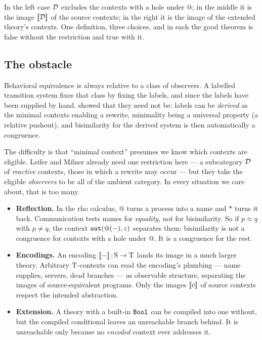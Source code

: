 \documentclass{article}
\begin{document}
\begin{center}
\end{center}

\noindent In the left case $\mathcal{D}$ excludes the contexts with a hole under $@$; in the middle it is the image $[\![\mathcal{D}]\!]$ of the source contexts; in the right it is the image of the extended theory's contexts. One definition, three choices, and in each the good theorem is false without the restriction and true with it.

\subsection{The obstacle}

Behavioral equivalence is always relative to a class of observers. A labelled transition system fixes that class by fixing the labels, and since \citet{ccs} the labels have been supplied by hand. \citet{lm} showed that they need not be: labels can be \emph{derived} as the minimal contexts enabling a rewrite, minimality being a universal property (a relative pushout), and bisimilarity for the derived system is then automatically a congruence.

The difficulty is that ``minimal context'' presumes we know which contexts are eligible. Leifer and Milner already need one restriction here --- a subcategory $\mathcal{D}$ of \emph{reactive} contexts, those in which a rewrite may occur --- but they take the eligible \emph{observers} to be all of the ambient category. In every situation we care about, that is too many.

\begin{itemize}
    \item \textbf{Reflection.} In the rho calculus, $@$ turns a process into a name and $\ast$ turns it back. Communication tests names for \emph{equality}, not for bisimilarity. So if $p\approx q$ with $p\neq q$, the context $\mathtt{out}(@(-),z)$ separates them: bisimilarity is not a congruence for contexts with a hole under $@$. It is a congruence for the rest.
    \item \textbf{Encodings.} An encoding $[\![-]\!]\,{:}\,\mathrm{S}\to\mathrm{T}$ lands its image in a much larger theory. Arbitrary $\mathrm{T}$-contexts can read the encoding's plumbing --- name supplies, servers, dead branches --- as observable structure, separating the images of source-equivalent programs. Only the images $[\![c]\!]$ of source contexts respect the intended abstraction.
    \item \textbf{Extension.} A theory with a built-in $\mathtt{Bool}$ can be compiled into one without, but the compiled conditional leaves an unreachable branch behind. It is unreachable only because no \emph{encoded} context ever addresses it.
\end{itemize}
\end{document}
